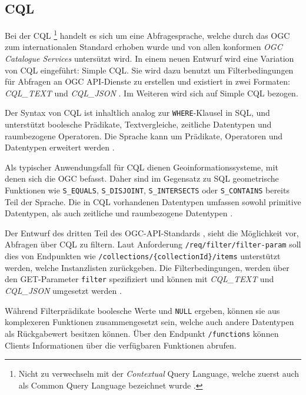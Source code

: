 \subsection{\acl{CQL}}

Bei der \acf{CQL} \footnote{Nicht zu verwechseln mit der \textit{Contextual} Query Language, welche zuerst auch als Common Query Language bezeichnet wurde \parencite{thelibraryofcongressCQLContextual2023, ZINGGentle2003}.} handelt es sich um eine Abfragesprache, welche durch das \ac{OGC} zum internationalen Standard erhoben wurde und von allen konformen \textit{\ac{OGC} Catalogue Services} untersützt wird.  In einem neuen Entwurf  wird eine Variation von \ac{CQL} eingeführt: Simple \ac{CQL}. Sie wird dazu benutzt um Filterbedingungen für Abfragen an \ac{OGC} API-Dienste zu erstellen und existiert in zwei Formaten: \textit{CQL\_TEXT} und \textit{CQL\_JSON} . Im Weiteren wird sich auf Simple \ac{CQL} bezogen.

Der Syntax von \ac{CQL} ist inhaltlich analog zur \texttt{WHERE}-Klausel in \acs{SQL}, und unterstützt boolesche Prädikate, Textvergleiche, zeitliche Datentypen und raumbezogene Operatoren. Die Sprache kann um Prädikate, Operatoren und Datentypen erweitert werden .

Als typischer Anwendungsfall für \ac{CQL} dienen Geoinformationssysteme, mit denen sich die \ac{OGC} befasst. Daher sind im Gegensatz zu \ac{SQL} geometrische Funktionen wie \texttt{S\_EQUALS}, \texttt{S\_DISJOINT}, \texttt{S\_INTERSECTS} oder \texttt{S\_CONTAINS} bereits Teil der Sprache. Die in \ac{CQL} vorhandenen Datentypen umfassen sowohl primitive Datentypen, als auch zeitliche und raumbezogene Datentypen .

Der Entwurf des dritten Teil des OGC-API-Standards , sieht die Möglichkeit vor, Abfragen über \ac{CQL} zu filtern. Laut Anforderung \texttt{/req/filter/filter-param} soll dies von Endpunkten wie \texttt{/collections/\{collectionId\}/items} unterstützt werden, welche Instanzlisten zurückgeben. Die Filterbedingungen, werden über den GET-Parameter \texttt{filter} spezifiziert und können mit \textit{CQL\_TEXT} und \textit{CQL\_JSON} umgesetzt werden .

Während Filterprädikate boolesche Werte und \texttt{NULL} ergeben, können sie aus komplexeren Funktionen zusammengesetzt sein, welche auch andere Datentypen als Rückgabewert besitzen können. Über den Endpunkt \texttt{/functions} können Clients Informationen über die verfügbaren Funktionen abrufen.
